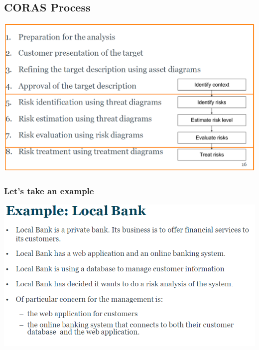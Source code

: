 \documentclass[10pt,a4paper,final]{report}
\begin{document}
\subsection{CORAS Process}
\includegraphics[scale=.4]{CORASProcess.png}
\subsubsection{Let's take an example}
\includegraphics[scale=.55]{Example.png}
\end{document}
